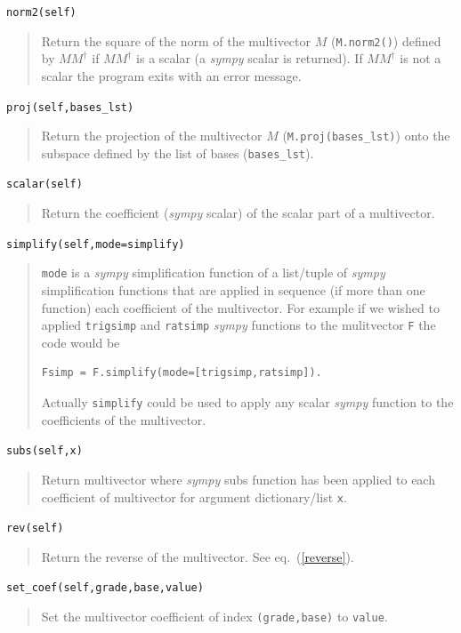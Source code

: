 \documentclass[12pt]{report}
\newcommand{\R}{\dagger}
\newcommand{\T}[1]{\texttt{#1}}
\begin{document}
\T{norm2(self)}
\begin{quote}
   Return the square of the norm of the multivector $M$ (\T{M.norm2()}) defined by $MM^{\R}$ if $MM^{\R}$ is a scalar (a \emph{sympy} scalar 
   is returned).  If $MM^{\R}$ is not a scalar the program exits with an error message.
\end{quote}

\T{proj(self,bases\_lst)}
\begin{quote}
   Return the projection of the multivector $M$ (\T{M.proj(bases\_lst)}) onto the subspace defined by the list of bases
   (\T{bases\_lst}).
\end{quote}

\T{scalar(self)}
\begin{quote}
    Return the coefficient (\emph{sympy} scalar) of the scalar part of a
    multivector.
\end{quote}

\T{simplify(self,mode=simplify)}
\begin{quote}
   \T{mode} is a \emph{sympy} simplification function of a list/tuple of \emph{sympy}
   simplification functions that are applied in sequence (if more than
   one function) each coefficient of the multivector.  For example if 
   we wished to applied \T{trigsimp} and \T{ratsimp} \emph{sympy} functions to the
   mulitvector \T{F} the code would be
   \begin{lstlisting}[numbers=none]
   Fsimp = F.simplify(mode=[trigsimp,ratsimp]).
   \end{lstlisting}
   
   Actually \T{simplify} could be used to apply any scalar \emph{sympy} function to
   the coefficients of the multivector.
\end{quote}

\T{subs(self,x)}
\begin{quote}
   Return multivector where \emph{sympy} subs function has been applied to each
   coefficient of multivector for argument dictionary/list \T{x}.
\end{quote}

\T{rev(self)}
\begin{quote}
   Return the reverse of the multivector.  See eq.~(\ref{reverse}).
\end{quote}

\T{set\_coef(self,grade,base,value)}
\begin{quote}
   Set the multivector coefficient of index \T{(grade,base)} to \T{value}.
\end{quote}
\end{document}
